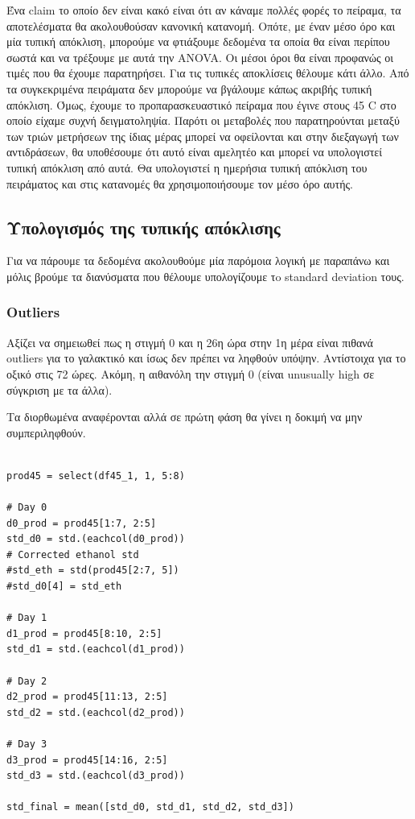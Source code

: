 \documentclass[11pt]{article}
\begin{document}
Ένα claim το οποίο δεν είναι κακό είναι ότι αν κάναμε πολλές φορές το πείραμα, τα αποτελέσματα θα ακολουθούσαν κανονική κατανομή. Οπότε, με έναν μέσο όρο και μία τυπική απόκλιση, μπορούμε να φτιάξουμε δεδομένα τα οποία θα είναι περίπου σωστά και να τρέξουμε με αυτά την ANOVA. Οι μέσοι όροι θα είναι προφανώς οι τιμές που θα έχουμε παρατηρήσει. Για τις τυπικές αποκλίσεις θέλουμε κάτι άλλο. Από τα συγκεκριμένα πειράματα δεν μπορούμε να βγάλουμε κάπως ακριβής τυπική απόκλιση. Όμως, έχουμε το προπαρασκευαστικό πείραμα που έγινε στους 45 C στο οποίο είχαμε συχνή δειγματοληψία. Παρότι οι μεταβολές που παρατηρούνται μεταξύ των τριών μετρήσεων της ίδιας μέρας μπορεί να οφείλονται και στην διεξαγωγή των αντιδράσεων, θα υποθέσουμε ότι αυτό είναι αμελητέο και μπορεί να υπολογιστεί τυπική απόκλιση από αυτά. Θα υπολογιστεί η ημερήσια τυπική απόκλιση του πειράματος και στις κατανομές θα χρησιμοποιήσουμε τον μέσο όρο αυτής.

\subsection{Υπολογισμός της τυπικής απόκλισης}
\label{sec:orgab72ce1}
Για να πάρουμε τα δεδομένα ακολουθούμε μία παρόμοια λογική με παραπάνω και μόλις βρούμε τα διανύσματα που θέλουμε υπολογίζουμε τo standard deviation τους.

\subsubsection{Outliers}
\label{sec:orge1da1c6}
Αξίζει να σημειωθεί πως η στιγμή 0 και η 26η ώρα στην 1η μέρα είναι πιθανά outliers για το γαλακτικό και ίσως δεν πρέπει να ληφθούν υπόψην. Αντίστοιχα για το οξικό στις 72 ώρες. Ακόμη, η αιθανόλη την στιγμή 0 (είναι unusually high σε σύγκριση με τα άλλα). 

Τα διορθωμένα αναφέρονται αλλά σε πρώτη φάση θα γίνει η δοκιμή να μην συμπεριληφθούν. 

\begin{verbatim}

prod45 = select(df45_1, 1, 5:8)

# Day 0
d0_prod = prod45[1:7, 2:5]
std_d0 = std.(eachcol(d0_prod))
# Corrected ethanol std
#std_eth = std(prod45[2:7, 5])
#std_d0[4] = std_eth

# Day 1
d1_prod = prod45[8:10, 2:5]
std_d1 = std.(eachcol(d1_prod))

# Day 2
d2_prod = prod45[11:13, 2:5]
std_d2 = std.(eachcol(d2_prod))

# Day 3
d3_prod = prod45[14:16, 2:5]
std_d3 = std.(eachcol(d3_prod))

std_final = mean([std_d0, std_d1, std_d2, std_d3])
\end{verbatim}
\end{document}
